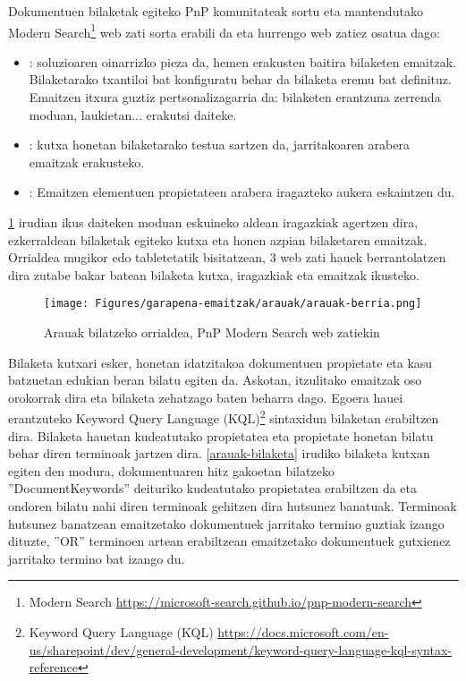 Dokumentuen bilaketak egiteko PnP komunitateak sortu eta mantendutako Modern Search\footnote{Modern Search \url{https://microsoft-search.github.io/pnp-modern-search}} web zati sorta erabili da eta hurrengo web zatiez osatua dago:

\begin{itemize}
  \item {}: soluzioaren oinarrizko pieza da, hemen erakusten baitira bilaketen emaitzak. Bilaketarako txantiloi bat konfiguratu behar da bilaketa eremu bat definituz. Emaitzen itxura guztiz pertsonalizagarria da: bilaketen erantzuna zerrenda moduan, laukietan... erakutsi daiteke.
  \item {}: kutxa honetan bilaketarako testua sartzen da, jarritakoaren arabera emaitzak erakusteko.
  \item {}: Emaitzen elementuen propietateen arabera iragazteko aukera eskaintzen du.
\end{itemize}

\ref{arauak-berria} irudian ikus daiteken moduan eskuineko aldean iragazkiak agertzen dira, ezkerraldean bilaketak egiteko kutxa eta honen azpian bilaketaren emaitzak.
Orrialdea mugikor edo tabletetatik bisitatzean, 3 web zati hauek berrantolatzen dira zutabe bakar batean bilaketa kutxa, iragazkiak eta emaitzak ikusteko. 

\begin{figure}[H]
\centering
\texttt{[image: Figures/garapena-emaitzak/arauak/arauak-berria.png]}
\caption{Arauak bilatzeko orrialdea, PnP Modern Search web zatiekin}
\label{arauak-berria}
\end{figure}

Bilaketa kutxari esker, honetan idatzitakoa dokumentuen propietate eta kasu batzuetan edukian beran bilatu egiten da. 
Askotan, itzulitako emaitzak oso orokorrak dira eta bilaketa zehatzago baten beharra dago. Egoera hauei erantzuteko Keyword Query Language (KQL)\footnote{Keyword Query Language (KQL) \url{https://docs.microsoft.com/en-us/sharepoint/dev/general-development/keyword-query-language-kql-syntax-reference}} sintaxidun bilaketan erabiltzen dira. Bilaketa hauetan kudeatutako propietatea eta propietate honetan bilatu behar diren terminoak jartzen dira. \ref{arauak-bilaketa} irudiko bilaketa kutxan egiten den modura, dokumentuaren hitz gakoetan bilatzeko ''DocumentKeywords'' deituriko kudeatutako propietatea erabiltzen da eta ondoren bilatu nahi diren terminoak gehitzen dira hutsunez banatuak. Terminoak hutsunez banatzean emaitzetako dokumentuek jarritako termino guztiak izango dituzte, ''OR'' terminoen artean erabiltzean emaitzetako dokumentuek gutxienez jarritako termino bat izango du.


